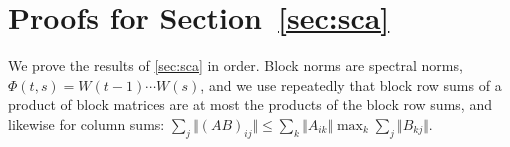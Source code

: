 \section{Proofs for \texorpdfstring{Section~\ref{sec:sca}}{scale}}\label{app:sca}

We prove the results of \cref{sec:sca} in order. Block norms are spectral norms, $\Phi(t,s)=W(t-1)\cdots W(s)$, and we use repeatedly that block row sums of a product of block matrices are at most the products of the block row sums, and likewise for column sums: $\sum_j\Vert(AB)_{ij}\Vert\le\sum_k\Vert A_{ik}\Vert\max_k\sum_j\Vert B_{kj}\Vert$.


